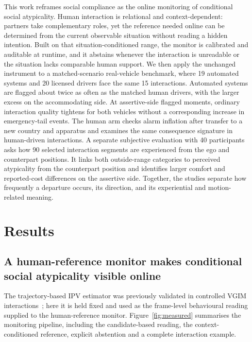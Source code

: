 \documentclass[12pt,a4paper]{article}
\begin{document}
This work reframes social compliance as the online monitoring of conditional social atypicality.
Human interaction is relational and context-dependent: partners take complementary roles, yet the
reference needed online can be determined from the current observable situation without reading a
hidden intention. Built on that situation-conditioned range, the monitor is calibrated and auditable
at runtime, and it abstains whenever the interaction is unreadable or the situation lacks comparable
human support. We then apply the unchanged instrument to a matched-scenario real-vehicle benchmark,
where 19 automated systems and 20 licensed drivers face the same 15 interactions. Automated systems
are flagged about twice as often as the matched human drivers, with the larger excess on the
accommodating side. At assertive-side flagged moments, ordinary interaction quality tightens for both
vehicles without a corresponding increase in emergency-tail events. The human arm checks alarm
inflation after transfer to a new country and apparatus and examines the same consequence signature
in human-driven interactions. A separate subjective evaluation with 40 participants asks how
90 selected interaction segments are experienced from the ego and counterpart positions. It links
both outside-range categories to perceived atypicality from the counterpart position and identifies
larger comfort and reported-cost differences on the assertive side. Together, the studies separate
how frequently a departure occurs, its direction, and its experiential and motion-related meaning.

\section{Results}

\subsection{A human-reference monitor makes conditional social atypicality visible online}

The trajectory-based IPV estimator was previously validated in controlled VGIM
interactions~\cite{zhao2024measuring}; here it is held fixed and used as the frame-level behavioural
reading supplied to the human-reference monitor. Figure~\ref{fig:measured} summarises the monitoring
pipeline, including the candidate-based reading, the context-conditioned reference, explicit
abstention and a complete interaction example.
\end{document}

